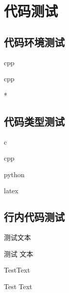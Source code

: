 \chapter{代码测试}

\section{代码环境测试}
\begin{Code}{cpp}
    
\end{Code}

\begin{Code}{cpp}
    
\end{Code}

\begin{Code}*
    
\end{Code}

\section{代码类型测试}
\begin{Code}[C语言]{c}
    
\end{Code}

\begin{Code}[C++语言]{cpp}
    
\end{Code}

\begin{Code}[Python语言]{python}
    
\end{Code}

\begin{Code}[LaTeX语言]{latex}
    
\end{Code}

\begin{Code}[纯文本]
    
\end{Code}

\section{行内代码测试}
测试文本

测试  文本

TestText

Test  Text



\code{\\}

\code{\%}

\code{\#}

\code{#}

\code{##}

\code{\\alpha}
